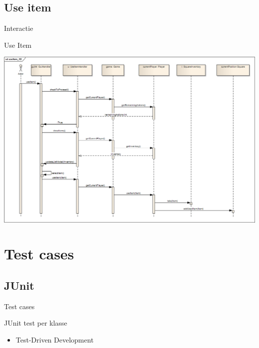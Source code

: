 \documentclass[t]{beamer}
\begin{document}
\subsection{Use item}
\begin{frame}{Interactie}
\begin{multicols}{2}
\tableofcontents[currentsection]
\end{multicols}
\end{frame}

\begin{frame}[plain]{Use Item}
\begin{center}
\includegraphics[width= 1\linewidth]{../uml/useItem_SD.png}
\end{center}
\end{frame}

\section{Test cases}
\subsection{JUnit}
\begin{frame}{Test cases}
\begin{multicols}{2}
\tableofcontents[currentsection]
\end{multicols}
\end{frame}

\begin{frame}{JUnit test per klasse}
\begin{itemize}
	\item Test-Driven Development
\end{itemize}
\end{frame}
\end{document}
